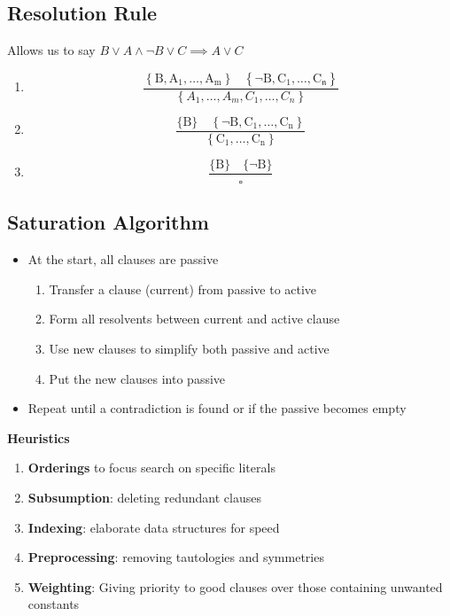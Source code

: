 \documentclass{article}
\begin{document}
\subsection{Resolution Rule}
Allows us to say $B \vee A \wedge \neg B \vee C \implies A \vee C$
\begin{enumerate}
    \item 
    $$\frac{\left\{\mathrm{B}, \mathrm{A}_{1}, \ldots, \mathrm{A}_{\mathrm{m}}\right\} \; \; \; \left\{\neg \mathrm{B}, \mathrm{C}_{1}, \ldots, \mathrm{C}_{\mathfrak{n}}\right\}}{\left\{A_{1}, \dots, A_{m}, C_{1}, \ldots, C_{n}\right\}} 
    $$
    \item 
    $$
    \frac{\{\mathrm{B}\} \quad\left\{\neg \mathrm{B}, \mathrm{C}_{1}, \ldots, \mathrm{C}_{\mathrm{n}}\right\}}{\left\{\mathrm{C}_{1}, \ldots, \mathrm{C}_{\mathrm{n}}\right\}}
    $$
    \item
    $$
    \frac{\{\mathrm{B}\} \quad\{\neg \mathrm{B}\}}{\square}
    $$
\end{enumerate}

\subsection{Saturation Algorithm}
\begin{itemize}
    \item At the start, all clauses are passive
    
    \begin{enumerate}
        \item Transfer a clause (current) from passive to active
        \item Form all resolvents between current and active clause
        \item Use new clauses to simplify both passive and active
        \item Put the new clauses into passive
    \end{enumerate}
    
    \item Repeat until a contradiction is found or if the passive becomes empty
\end{itemize}

\bigskip
\noindent
\textbf{Heuristics}
\begin{enumerate}
    \item \textbf{Orderings} to focus search on specific literals
    \item \textbf{Subsumption}: deleting redundant clauses
    \item \textbf{Indexing}: elaborate data structures for speed
    \item \textbf{Preprocessing}: removing tautologies and symmetries
    \item \textbf{Weighting}: Giving priority to good clauses over those containing unwanted constants
\end{enumerate}
\end{document}

